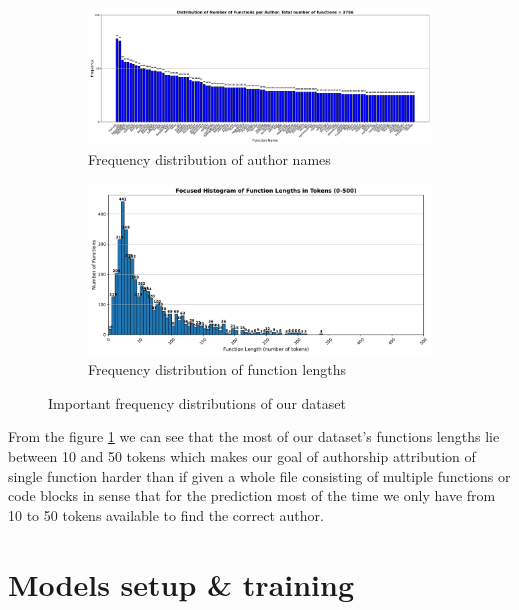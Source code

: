 \documentclass{article}
\begin{document}
\begin{figure}[h]
    \centering
    \begin{subfigure}{0.48\textwidth} %
        \centering
        \includegraphics[width=\linewidth]{figures/distribution_names.pdf}
        \caption{Frequency distribution of author names}
        \label{fig:distr_names}
    \end{subfigure}
    \hfill
    \begin{subfigure}{0.48\textwidth}
        \centering
        \includegraphics[width=\linewidth]{figures/distr_lens_tokens.pdf}
        \caption{Frequency distribution of function lengths}
        \label{fig:disrt_lens}
    \end{subfigure}
    \caption{Important frequency distributions of our dataset}
    \label{fig:eda_distr}
\end{figure}

From the figure \ref{fig:distr_names} we can see that the most of our dataset's 
functions lengths lie between 10 and 50 tokens which makes our goal of authorship attribution of single function
harder than if given a whole file consisting of multiple functions or code blocks in sense that for the prediction
most of the time we only have from 10 to 50 tokens available to find the correct author.

\section{Models setup \& training}
\end{document}
